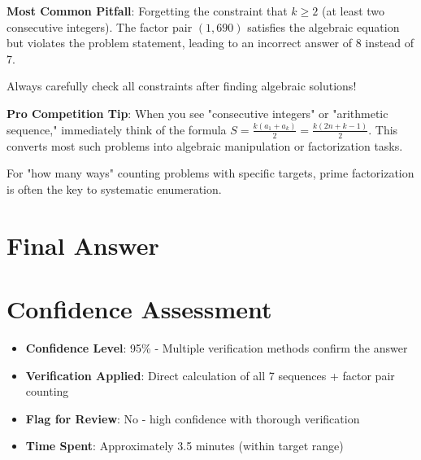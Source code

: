 \documentclass[11pt]{article}
\begin{document}
\begin{warningbox}
\textbf{Most Common Pitfall}: Forgetting the constraint that $k \geq 2$ (at least two consecutive integers). The factor pair $(1, 690)$ satisfies the algebraic equation but violates the problem statement, leading to an incorrect answer of 8 instead of 7.

Always carefully check all constraints after finding algebraic solutions!
\end{warningbox}

\begin{tipbox}
\textbf{Pro Competition Tip}: When you see "consecutive integers" or "arithmetic sequence," immediately think of the formula $S = \frac{k(a_1 + a_k)}{2} = \frac{k(2n+k-1)}{2}$. This converts most such problems into algebraic manipulation or factorization tasks.

For "how many ways" counting problems with specific targets, prime factorization is often the key to systematic enumeration.
\end{tipbox}

\section*{Final Answer}

\section*{Confidence Assessment}
\begin{itemize}[leftmargin=*]
    \item \textbf{Confidence Level}: 95\% - Multiple verification methods confirm the answer
    \item \textbf{Verification Applied}: Direct calculation of all 7 sequences + factor pair counting
    \item \textbf{Flag for Review}: No - high confidence with thorough verification
    \item \textbf{Time Spent}: Approximately 3.5 minutes (within target range)
\end{itemize}
\end{document}
